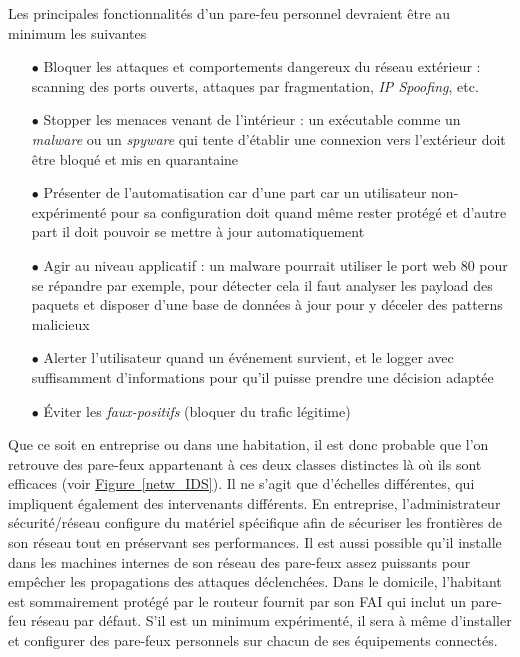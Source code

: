 \documentclass[]{article}
\newcommand{\wordlink}[2]{\hyperref[#1]{#2~\ref{#1}}}
\begin{document}

\par Les principales fonctionnalités d'un pare-feu personnel devraient être au minimum les suivantes \cite{Shimonski2013}
\vspace{0.1cm}
\begin{itemize}
\item[$\bullet$] Bloquer les attaques et comportements dangereux du réseau extérieur : scanning des ports ouverts, attaques par fragmentation, \textit{IP Spoofing}, etc.   
\vspace{0.2cm}
\item[$\bullet$] Stopper les menaces venant de l'intérieur : un exécutable comme un \textit{malware} ou un \textit{spyware} qui tente d'établir une connexion vers l'extérieur doit être bloqué et mis en quarantaine
\vspace{0.2cm}
\item[$\bullet$] Présenter de l'automatisation car d'une part car un utilisateur non-expérimenté pour sa configuration doit quand même rester protégé et d'autre part il doit pouvoir se mettre à jour automatiquement
\vspace{0.2cm}
\item[$\bullet$] Agir au niveau applicatif : un malware pourrait utiliser le port web 80 pour se répandre par exemple, pour détecter cela il faut analyser les payload des paquets et disposer d'une base de données à jour pour y déceler des patterns malicieux
\vspace{0.2cm}
\item[$\bullet$] Alerter l'utilisateur quand un événement survient, et le logger avec suffisamment d'informations pour qu'il puisse prendre une décision adaptée
\vspace{0.2cm}
\item[$\bullet$] Éviter les \textit{faux-positifs} (bloquer du trafic légitime)
\end{itemize}
\vspace{0.5cm}
\par Que ce soit en entreprise ou dans une habitation, il est donc probable que l'on retrouve des pare-feux appartenant à ces deux classes distinctes là où ils sont efficaces (voir  \wordlink{netw_IDS}{Figure}). Il ne s'agit que d'échelles différentes, qui impliquent également des intervenants différents. En entreprise, l'administrateur sécurité/réseau configure du matériel spécifique afin de sécuriser les frontières de son réseau tout en préservant ses performances. Il est aussi possible qu'il installe dans les machines internes de son réseau des pare-feux assez puissants pour empêcher les propagations des attaques déclenchées. Dans le domicile, l'habitant est sommairement protégé par le routeur fournit par son FAI qui inclut un pare-feu réseau par défaut. S'il est un minimum expérimenté, il sera à même d'installer et configurer des pare-feux personnels sur chacun de ses équipements connectés.   
\end{document}

